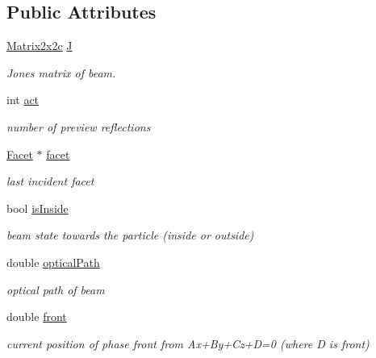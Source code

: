 \subsection*{Public Attributes}
\begin{DoxyCompactItemize}
\item 
\mbox{\label{class_beam_a17dc5762614f2586d61d1bd3f52a8645}} 
\mbox{\hyperlink{class_matrix2x2c}{Matrix2x2c}} \mbox{\hyperlink{class_beam_a17dc5762614f2586d61d1bd3f52a8645}{J}}
\begin{DoxyCompactList}\small\item\em Jones matrix of beam. \end{DoxyCompactList}\item 
\mbox{\label{class_beam_a9f3f0cba366e2762398a6f58a2e55a02}} 
int \mbox{\hyperlink{class_beam_a9f3f0cba366e2762398a6f58a2e55a02}{act}}
\begin{DoxyCompactList}\small\item\em number of preview reflections \end{DoxyCompactList}\item 
\mbox{\label{class_beam_a0d17c3816a24da6cdbd933a32dea711c}} 
\mbox{\hyperlink{class_facet}{Facet}} $\ast$ \mbox{\hyperlink{class_beam_a0d17c3816a24da6cdbd933a32dea711c}{facet}}
\begin{DoxyCompactList}\small\item\em last incident facet \end{DoxyCompactList}\item 
\mbox{\label{class_beam_a823d6dda3dc96dd2382e41647bda0268}} 
bool \mbox{\hyperlink{class_beam_a823d6dda3dc96dd2382e41647bda0268}{is\+Inside}}
\begin{DoxyCompactList}\small\item\em beam state towards the particle (inside or outside) \end{DoxyCompactList}\item 
\mbox{\label{class_beam_a9b914eb95bb720ef405edfb80bda3c41}} 
double \mbox{\hyperlink{class_beam_a9b914eb95bb720ef405edfb80bda3c41}{optical\+Path}}
\begin{DoxyCompactList}\small\item\em optical path of beam \end{DoxyCompactList}\item 
\mbox{\label{class_beam_a2640aeff4f9d38ff8c6da5cabda0b070}} 
double \mbox{\hyperlink{class_beam_a2640aeff4f9d38ff8c6da5cabda0b070}{front}}
\begin{DoxyCompactList}\small\item\em current position of phase front from Ax+\+By+\+Cz+D=0 (where D is front) \end{DoxyCompactList}\end{DoxyCompactItemize}
